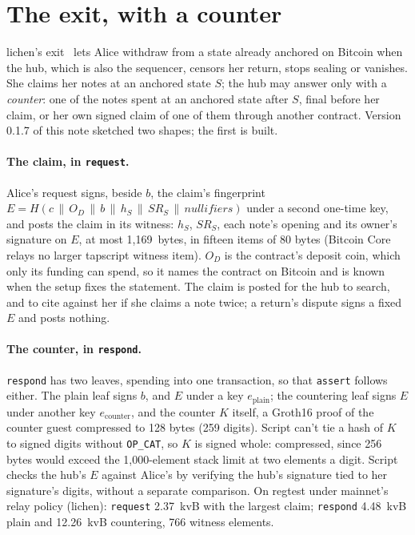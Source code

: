 \documentclass[11pt]{article}
\newcommand{\tx}[1]{\texttt{#1}}
\begin{document}
\section{The exit, with a counter}
\label{sec:counter}

lichen's exit~\cite{lichen} lets Alice withdraw from a state already
anchored on Bitcoin when the hub, which is also the sequencer, censors
her return, stops sealing or vanishes. She claims her notes at an
anchored state $S$; the hub may answer only with a \emph{counter}: one of
the notes spent at an anchored state after $S$, final before her claim,
or her own signed claim of one of them through another contract. Version
0.1.7 of this note sketched two shapes; the first is built.

\paragraph{The claim, in \tx{request}.} Alice's request signs, beside
$b$, the claim's fingerprint
$E = H(c \,\|\, O_D \,\|\, b \,\|\, h_S \,\|\, \mathit{SR}_S \,\|\, \mathit{nullifiers})$
under a second one-time key, and posts the claim in its witness: $h_S$,
$\mathit{SR}_S$, each note's opening and its owner's signature on $E$, at
most 1,169~bytes, in fifteen items of 80 bytes (Bitcoin Core relays no
larger tapscript witness item). $O_D$ is the contract's deposit coin,
which only its funding can spend, so it names the contract on Bitcoin
and is known when the setup fixes the statement. The claim is posted
for the hub to search, and to cite against her if she claims a note
twice; a return's dispute signs a fixed $E$ and posts nothing.

\paragraph{The counter, in \tx{respond}.} \tx{respond} has two leaves,
spending into one transaction, so that \tx{assert} follows either. The
plain leaf signs $b$, and $E$ under a key $e_{\mathrm{plain}}$; the
countering leaf signs $E$ under another key $e_{\mathrm{counter}}$, and
the counter $K$ itself, a Groth16 proof of the counter guest compressed
to 128 bytes (259 digits). Script can't tie a hash of $K$ to signed
digits without \texttt{OP\_CAT}, so $K$ is signed whole: compressed,
since 256 bytes would exceed the 1,000-element stack limit at two
elements a digit. Script checks the hub's $E$ against Alice's by
verifying the hub's signature tied to her signature's digits, without a
separate comparison. On regtest under mainnet's relay policy (lichen):
\tx{request} 2.37~kvB with the largest claim; \tx{respond} 4.48~kvB
plain and 12.26~kvB countering, 766 witness elements.
\end{document}
